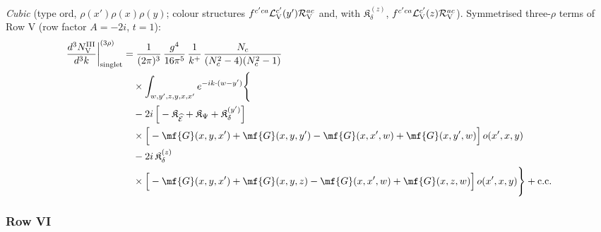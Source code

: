 {\emph{Cubic} (type ord, $\rho(x')\rho(x)\rho(y)$; colour structures $f^{c'ca}\mathcal{L}^{c'}_{\rm V}(y')\mathcal{R}^{ac}_{\rm V}$ and, with $\mathfrak{K}_{\delta}^{(z)}$, $f^{c'ca}\mathcal{L}^{c'}_{\rm V}(z)\mathcal{R}^{ac}_{\rm V}$).
 Symmetrised three-$\rho$ terms of Row V (row factor $A=-2i$, $t=1$):
\begin{align}
\frac{d^{3}N^{\rm III}_{\rm V}}{d^{3}k}\bigg|^{(3\rho)}_{\rm singlet}&=\frac{1}{(2\pi)^{3}}\,\frac{g^{4}}{16\pi^{5}}\,\frac{1}{k^{+}}\,\frac{N_{c}}{(N_{c}^{2}-4)(N_{c}^{2}-1)}\notag\\
&\quad\times\int_{w,y',z,y,x,x'}e^{-ik\cdot(w-y')}\Bigg\{\notag\\
&\quad-2i\,\Big[-\mathfrak{K}_{\widehat{\mathcal{E}}}+\mathfrak{K}_{\Psi}+\mathfrak{K}_{\delta}^{(y')}\Big]\notag\\
&\quad\times\Big[-\mf{G}(x,y,x')+\mf{G}(x,y,y')-\mf{G}(x,x',w)+\mf{G}(x,y',w)\Big]\,o(x',x,y)\notag\\
&\quad-2i\,\mathfrak{K}_{\delta}^{(z)}\notag\\
&\quad\times\Big[-\mf{G}(x,y,x')+\mf{G}(x,y,z)-\mf{G}(x,x',w)+\mf{G}(x,z,w)\Big]\,o(x',x,y)\Bigg\}+{\rm c.c.}\label{eq:s-o-III-V}
\end{align}

\subsubsection*{Row VI}

}
